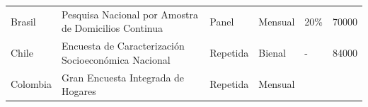 \documentclass[12pt,spanish,]{book}
\begin{document}
\begin{longtable}[]{@{}llllll@{}}
\begin{minipage}[t]{0.13\columnwidth}
Brasil\strut
\end{minipage} & \begin{minipage}[t]{0.38\columnwidth}\raggedright
Pesquisa Nacional por Amostra de Domicilios Continua\strut
\end{minipage} & \begin{minipage}[t]{0.06\columnwidth}\raggedright
Panel\strut
\end{minipage} & \begin{minipage}[t]{0.08\columnwidth}\raggedright
Mensual\strut
\end{minipage} & \begin{minipage}[t]{0.06\columnwidth}\raggedright
20\%\strut
\end{minipage} & \begin{minipage}[t]{0.13\columnwidth}\raggedright
70000\strut
\end{minipage}\tabularnewline
\begin{minipage}[t]{0.13\columnwidth}\raggedright
Chile\strut
\end{minipage} & \begin{minipage}[t]{0.38\columnwidth}\raggedright
Encuesta de Caracterización Socioeconómica Nacional\strut
\end{minipage} & \begin{minipage}[t]{0.06\columnwidth}\raggedright
Repetida\strut
\end{minipage} & \begin{minipage}[t]{0.08\columnwidth}\raggedright
Bienal\strut
\end{minipage} & \begin{minipage}[t]{0.06\columnwidth}\raggedright
-\strut
\end{minipage} & \begin{minipage}[t]{0.13\columnwidth}\raggedright
84000\strut
\end{minipage}\tabularnewline
\begin{minipage}[t]{0.13\columnwidth}\raggedright
Colombia\strut
\end{minipage} & \begin{minipage}[t]{0.38\columnwidth}\raggedright
Gran Encuesta Integrada de Hogares\strut
\end{minipage} & \begin{minipage}[t]{0.06\columnwidth}\raggedright
Repetida\strut
\end{minipage} & \begin{minipage}[t]{0.08\columnwidth}\raggedright
Mensual\strut
\end{minipage} & \begin{minipage}[t]{0.06\columnwidth}\raggedright

\end{minipage}
\end{longtable}
\end{document}
